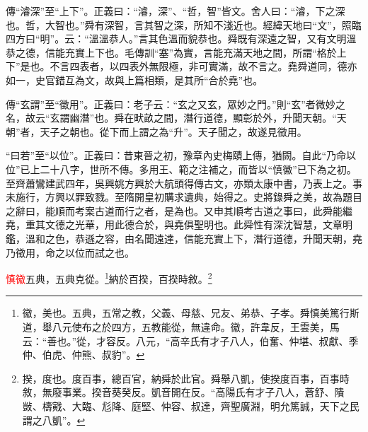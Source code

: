 {\noindent\zhuan{}\fzbyks 傳“濬深”至“上下”。正義曰：“濬，深”、“哲，智”皆文。舍人曰：“濬，下之深也。哲，大智也。”舜有深智，言其智之深，所知不淺近也。經緯天地曰“文”，照臨四方曰“明”。云：“溫溫恭人。”言其色溫而貌恭也。舜既有深遠之智，又有文明溫恭之德，信能充實上下也。毛傳訓“塞”為實，言能充滿天地之間，所謂“格於上下”是也。不言四表者，以四表外無限極，非可實滿，故不言之。堯舜道同，德亦如一，史官錯互為文，故與上篇相類，是其所“合於堯”也。 \par}

{\noindent\zhuan{}\fzbyks 傳“玄謂”至“徵用”。正義曰：老子云：“玄之又玄，眾妙之門。”則“玄”者微妙之名，故云“玄謂幽潛”也。舜在畎畝之間，潛行道德，顯彰於外，升聞天朝。“天朝”者，天子之朝也。從下而上謂之為“升”。天子聞之，故遂見徵用。 \par}

{\noindent\shu{}\fzkt “曰若”至“以位”。正義曰：昔東晉之初，豫章內史梅賾上傳，猶闕。自此“乃命以位”已上二十八字，世所不傳。多用王、範之注補之，而皆以“慎徽”已下為之初。至齊蕭鸞建武四年，吳興姚方興於大航頭得傳古文，亦類太康中書，乃表上之。事未施行，方興以罪致戮。至隋開皇初購求遺典，始得之。史將錄舜之美，故為題目之辭曰，能順而考案古道而行之者，是為也。又申其順考古道之事曰，此舜能繼堯，重其文德之光華，用此德合於，與堯俱聖明也。此舜性有深沈智慧，文章明鑑，溫和之色，恭遜之容，由名聞遠達，信能充實上下，潛行道德，升聞天朝，堯乃徵用，命之以位而試之也。 \par}

\textcolor{red}{慎徽}五典，五典克從。\footnote{徽，美也。五典，五常之教，父義、母慈、兄友、弟恭、子孝。舜慎美篤行斯道，舉八元使布之於四方，五教能從，無違命。徽，許韋反，王雲美，馬云：“善也。”從，才容反。八元，“高辛氏有才子八人，伯奮、仲堪、叔獻、季仲、伯虎、仲熊、叔豹”。}納於百揆，百揆時敘。\footnote{揆，度也。度百事，總百官，納舜於此官。舜舉八凱，使揆度百事，百事時敘，無廢事業。揆音葵癸反。凱音開在反。“高陽氏有才子八人，蒼舒、隤敱、檮戭、大臨、尨降、庭堅、仲容、叔達，齊聖廣淵，明允篤誠，天下之民謂之八凱”。}

